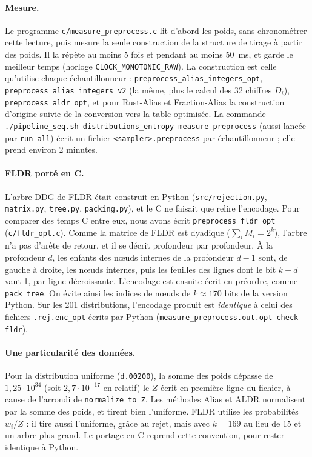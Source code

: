 \documentclass[11pt,a4paper]{article}
\newcommand{\code}[1]{\texttt{#1}}
\begin{document}
\paragraph{Mesure.} Le programme \code{c/measure\_preprocess.c} lit d'abord les poids,
sans chronométrer cette lecture, puis mesure la seule construction de la structure de
tirage à partir des poids. Il la répète au moins 5 fois et pendant au moins 50~ms, et
garde le meilleur temps (horloge \code{CLOCK\_MONOTONIC\_RAW}). La construction est celle
qu'utilise chaque échantillonneur :
\code{preprocess\_alias\_integers\_opt}, \code{preprocess\_alias\_integers\_v2} (la même,
plus le calcul des 32 chiffres $D_i$), \code{preprocess\_aldr\_opt}, et pour Rust-Alias
et Fraction-Alias la construction d'origine suivie de la conversion vers la table
optimisée. La commande \code{./pipeline\_seq.sh distributions\_entropy
measure-preprocess} (aussi lancée par \code{run-all}) écrit un fichier
\code{<sampler>.preprocess} par échantillonneur ; elle prend environ 2 minutes.

\paragraph{FLDR porté en C.} L'arbre DDG de FLDR était construit en Python
(\code{src/rejection.py}, \code{matrix.py}, \code{tree.py}, \code{packing.py}), et le C
ne faisait que relire l'encodage. Pour comparer des temps C entre eux, nous avons écrit
\code{preprocess\_fldr\_opt} (\code{c/fldr\_opt.c}). Comme la matrice de FLDR est
dyadique ($\sum_i M_i = 2^k$), l'arbre n'a pas d'arête de retour, et il se décrit
profondeur par profondeur. À la profondeur $d$, les enfants des nœuds internes de la
profondeur $d-1$ sont, de gauche à droite, les nœuds internes, puis les feuilles des
lignes dont le bit $k-d$ vaut 1, par ligne décroissante. L'encodage est ensuite écrit
en préordre, comme \code{pack\_tree}. On évite ainsi les indices de nœuds de
$k \approx 170$ bits de la version Python. Sur les 201 distributions, l'encodage produit
est \emph{identique} à celui des fichiers \code{.rej.enc\_opt} écrits par Python
(\code{measure\_preprocess.out.opt check-fldr}).

\paragraph{Une particularité des données.} Pour la distribution uniforme
(\code{d.00200}), la somme des poids dépasse de $1{,}25\cdot 10^{34}$ (soit
$2{,}7\cdot 10^{-17}$ en relatif) le $Z$ écrit en première ligne du fichier, à cause de
l'arrondi de \code{normalize\_to\_Z}. Les méthodes Alias et ALDR normalisent par la
somme des poids, et tirent bien l'uniforme. FLDR utilise les probabilités $w_i/Z$ :
il tire aussi l'uniforme, grâce au rejet, mais avec $k = 169$ au lieu de 15 et un arbre
plus grand. Le portage en C reprend cette convention, pour rester identique à Python.
\end{document}
